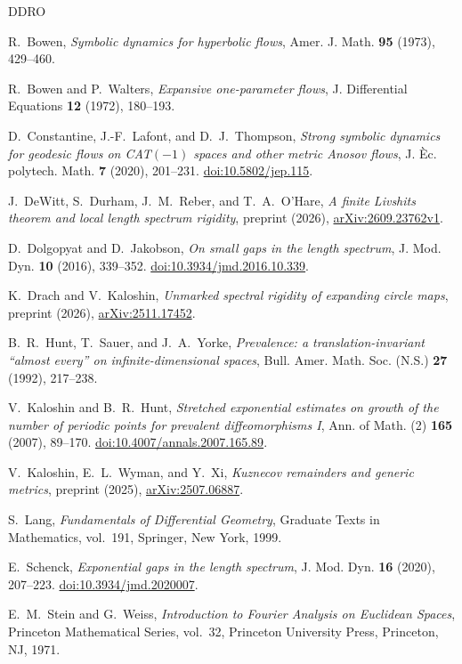 \documentclass[10pt,oneside,reqno]{amsproc}
\numberwithin{equation}{section}
\theoremstyle{definition}
\theoremstyle{remark}
\begin{document}
\begin{thebibliography}{DDRO}

 R.~Bowen, \emph{Symbolic dynamics for hyperbolic flows}, Amer. J. Math. \textbf{95} (1973), 429--460.

 R.~Bowen and P.~Walters, \emph{Expansive one-parameter flows}, J. Differential Equations \textbf{12} (1972), 180--193.

 D.~Constantine, J.-F.~Lafont, and D.~J.~Thompson, \emph{Strong symbolic dynamics for geodesic flows on CAT$(-1)$ spaces and other metric Anosov flows}, J. \`Ec. polytech. Math. \textbf{7} (2020), 201--231. \href{https://doi.org/10.5802/jep.115}{doi:10.5802/jep.115}.

 J.~DeWitt, S.~Durham, J.~M.~Reber, and T.~A.~O'Hare, \emph{A finite Livshits theorem and local length spectrum rigidity}, preprint (2026), \href{https://arxiv.org/abs/2609.23762v1}{arXiv:2609.23762v1}.

 D.~Dolgopyat and D.~Jakobson, \emph{On small gaps in the length spectrum}, J. Mod. Dyn. \textbf{10} (2016), 339--352. \href{https://doi.org/10.3934/jmd.2016.10.339}{doi:10.3934/jmd.2016.10.339}.

 K.~Drach and V.~Kaloshin, \emph{Unmarked spectral rigidity of expanding circle maps}, preprint (2026), \href{https://arxiv.org/abs/2511.17452}{arXiv:2511.17452}.

 B.~R.~Hunt, T.~Sauer, and J.~A.~Yorke, \emph{Prevalence: a translation-invariant ``almost every'' on infinite-dimensional spaces}, Bull. Amer. Math. Soc. (N.S.) \textbf{27} (1992), 217--238.

 V.~Kaloshin and B.~R.~Hunt, \emph{Stretched exponential estimates on growth of the number of periodic points for prevalent diffeomorphisms I}, Ann. of Math. (2) \textbf{165} (2007), 89--170. \href{https://doi.org/10.4007/annals.2007.165.89}{doi:10.4007/annals.2007.165.89}.

 V.~Kaloshin, E.~L.~Wyman, and Y.~Xi, \emph{Kuznecov remainders and generic metrics}, preprint (2025), \href{https://arxiv.org/abs/2507.06887}{arXiv:2507.06887}.

 S.~Lang, \emph{Fundamentals of Differential Geometry}, Graduate Texts in Mathematics, vol.~191, Springer, New York, 1999.

 E.~Schenck, \emph{Exponential gaps in the length spectrum}, J. Mod. Dyn. \textbf{16} (2020), 207--223. \href{https://doi.org/10.3934/jmd.2020007}{doi:10.3934/jmd.2020007}.

 E.~M.~Stein and G.~Weiss, \emph{Introduction to Fourier Analysis on Euclidean Spaces}, Princeton Mathematical Series, vol.~32, Princeton University Press, Princeton, NJ, 1971.

\end{thebibliography}
\end{document}
